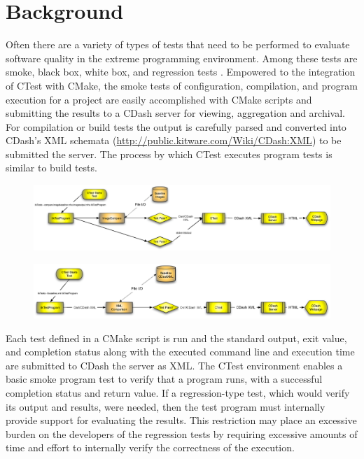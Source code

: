 \documentclass{InsightArticle}
\begin{document}
\section{Background}

Often there are a variety of types of tests that need to be performed to evaluate software quality in the extreme programming environment. Among these tests are smoke, black box, white box, and regression tests \cite{MasteringCMake18}. Empowered to the integration of CTest with CMake, the smoke tests of configuration, compilation, and program execution for a project are easily accomplished with CMake scripts and submitting the results to a CDash server for viewing, aggregation and archival. For compilation or build tests the output is carefully parsed and converted into CDash's XML schemata (\url{http://public.kitware.com/Wiki/CDash:XML}) to be submitted the server. The process by which CTest executes program tests is similar to build tests.



\begin{figure}
\center
\includegraphics[width=.9\textwidth]{itkFlowDiagram.eps}
\label{fig:itkFlowDiagram}
\end{figure}


\begin{figure}
\center
\includegraphics[width=.9\textwidth]{itkNewFlowDiagram.eps}
\label{fig:itkNewFlowDiagram}
\end{figure}

Each test defined in a CMake script is run and the standard output, exit value, and completion status along with the executed command line and execution time are submitted to CDash the server as XML. The CTest environment enables a basic smoke program test to verify that a program runs, with a successful completion status and return value. If a regression-type test, which would verify its output and results, were needed, then the test program must internally provide support for evaluating the results. This restriction may place an excessive burden on the developers of the regression tests by requiring excessive amounts of time and effort to internally verify the correctness of the execution.  
\end{document}
